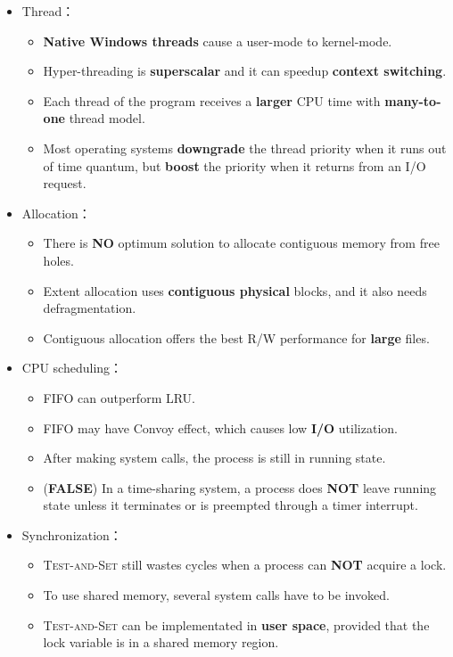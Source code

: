 \begin{itemize}
\begin{itemize}
    \end{itemize}
    \item Thread： \begin{itemize}
        \item \textbf{Native Windows threads} cause a user-mode to kernel-mode.
        \item Hyper-threading is \textbf{superscalar} and it can speedup \textbf{context switching}.
        \item Each thread of the program receives a \textbf{larger} CPU time with \textbf{many-to-one} thread model.
        \item Most operating systems \textbf{downgrade} the thread priority when it runs out of time quantum, but \textbf{boost} the priority when it returns from an I/O request.
    \end{itemize}
    \item Allocation： \begin{itemize}
        \item There is \textbf{NO} optimum solution to allocate contiguous memory from free holes.
        \item Extent allocation uses \textbf{contiguous physical} blocks, and it also needs defragmentation.
        \item Contiguous allocation offers the best R/W performance for \textbf{large} files.
    \end{itemize}
    \item CPU scheduling： \begin{itemize}
        \item FIFO can outperform LRU.
        \item FIFO may have Convoy effect, which causes low \textbf{I/O} utilization.
        \item After making system calls, the process is still in running state.
        \item (\textbf{FALSE}) In a time-sharing system, a process does \textbf{NOT} leave running state unless it terminates or is preempted through a timer interrupt. 
    \end{itemize}
    \item Synchronization： \begin{itemize}
        \item \textsc{Test-and-Set} still wastes cycles when a process can \textbf{NOT} acquire a lock. 
        \item To use shared memory, several system calls have to be invoked.
        \item \textsc{Test-and-Set} can be implementated in \textbf{user space}, provided that the lock variable is in a shared memory region.

\end{itemize}
\end{itemize}
